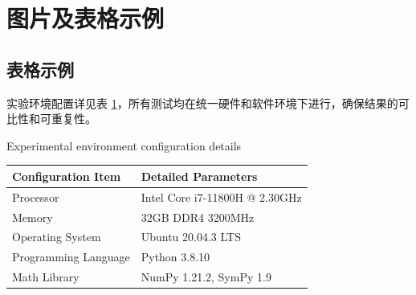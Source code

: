 
\section{图片及表格示例}

\subsection{表格示例}

实验环境配置详见表 \ref{tab:experiment_environment}，所有测试均在统一硬件和软件环境下进行，确保结果的可比性和可重复性。

\begin{table}[htbp]
	
	\centering %
	{Experimental environment configuration details} %
	\label{tab:experiment_environment} %
	
	\begin{tabular}{ll} %
		\toprule %
		\textbf{Configuration Item} & \textbf{Detailed Parameters} \\ %
		\midrule %
		Processor & Intel Core i7-11800H @ 2.30GHz \\
		Memory & 32GB DDR4 3200MHz \\
		Operating System & Ubuntu 20.04.3 LTS \\
		Programming Language & Python 3.8.10 \\
		Math Library & NumPy 1.21.2, SymPy 1.9 \\
		\bottomrule %
	\end{tabular}
\end{table}


